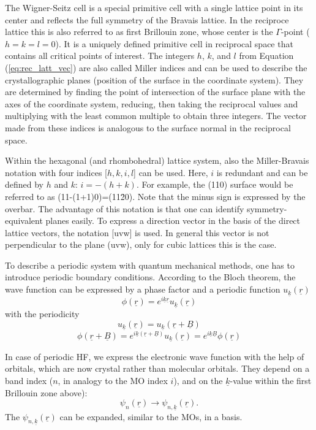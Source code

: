 \documentclass[11pt,DIV=13,BCOR=5mm,a4paper,headinclude]{scrbook}
\renewcommand{\vec}[1]{\underline{#1}}
\begin{document}
The Wigner-Seitz cell is a special primitive cell with a single lattice point in its center and reflects the full symmetry of the Bravais lattice.
In the reciproce lattice this is also referred to as first Brillouin zone, whose center is the $\Gamma$-point ($h=k=l=0$).
It is a uniquely defined primitive cell in reciprocal space that contains all critical points of interest.
The integers $h$, $k$, and $l$ from Equation (\ref{eq:rec_latt_vec}) are also called Miller indices and can be used to describe the crystallographic planes (position of the surface in the coordinate system).
They are determined by finding the point of intersection of the surface plane with the axes of the coordinate system, reducing, then taking the reciprocal values and multiplying with the least common multiple to obtain three integers.
The vector made from these indices is analogous to the surface normal in the reciprocal space.


Within the hexagonal (and rhombohedral) lattice system, also the Miller-Bravais notation with four indices [$h,k,i,l$] can be used.
Here, $i$ is redundant and can be defined by $h$ and $k$: $i=-(h+k)$.
For example, the (110) surface would be referred to as (11-(1+1)0)=(11\=20).
Note that the minus sign is expressed by the overbar.
The advantage of this notation is that one can identify symmetry-equivalent planes easily.
To express a direction vector in the basis of the direct lattice vectors, the notation [uvw] is used.
In general this vector is not perpendicular to the plane (uvw), only for cubic lattices this is the case.


To describe a periodic system with quantum mechanical methods, one has to introduce periodic boundary conditions.
According to the Bloch theorem\cite{Bloch1928}, the wave function can be expressed by a phase factor and a periodic function $u_{\vec{k}}(\vec{r})$
\begin{equation}
\phi(\vec{r})=e^{i\vec{k}\vec{r}}u_{\vec{k}}(\vec{r})
\end{equation}
with the periodicity
\begin{equation}
u_{\vec{k}}(\vec{r})=u_{\vec{k}}(\vec{r}+\vec{B})
\end{equation}
\begin{equation}
\phi(\vec{r}+\vec{B})=e^{i\vec{k}(\vec{r}+\vec{B})}u_{\vec{k}}(\vec{r})=e^{i\vec{k}\vec{B}}\phi(\vec{r})
\end{equation}

In case of periodic HF, we express the electronic wave function with the help of orbitals, which are now crystal rather than molecular orbitals.
They depend on a band index ($n$, in analogy to the MO index $i$), and on the $\vec{k}$-value within the first Brillouin zone above):
\begin{equation}
 \psi_n(\vec{r})\rightarrow\psi_{n,\vec{k}}(\vec{r}).
\end{equation}
The $\psi_{n,\vec{k}}(\vec{r})$ can be expanded, similar to the MOs, in a basis.
\end{document}
